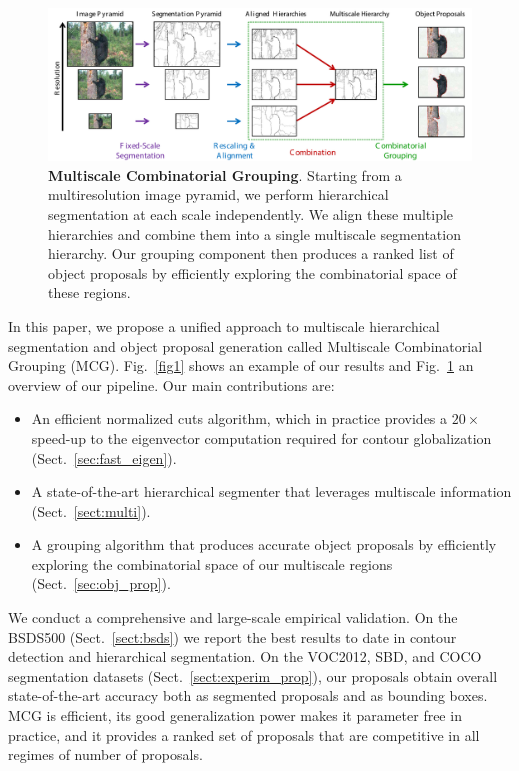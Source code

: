 \documentclass[10pt,journal,cspaper,compsoc]{IEEEtran}
\begin{document}
\begin{figure}[t]
\begin{center}
   \includegraphics[width=0.9\linewidth]{figures/overview/overview.pdf}
\end{center}
   \caption{\textbf{Multiscale Combinatorial Grouping}. Starting from a multiresolution image pyramid, we perform hierarchical segmentation at each scale independently. 
We align these multiple hierarchies and combine them into a single multiscale segmentation hierarchy. 
Our grouping component then produces a ranked list of object proposals by efficiently exploring the combinatorial space of these regions.}
\label{fig:overview}
\end{figure}


In this paper, we propose a unified approach to multiscale hierarchical segmentation and object proposal generation called Multiscale Combinatorial Grouping (MCG). 
Fig.~\ref{fig1} shows an example of our results and Fig.~\ref{fig:overview} an overview of our pipeline. Our main contributions are:
\begin{itemize}
\item An efficient normalized cuts algorithm, which in practice provides a $20\times$ speed-up to the eigenvector computation required for contour globalization \cite{Arbelaez2011,renNIPS12} (Sect.~\ref{sec:fast_eigen}).
\item A state-of-the-art hierarchical segmenter that leverages multiscale information (Sect.~\ref{sect:multi}).
\item A grouping algorithm that produces accurate object proposals by efficiently exploring the combinatorial space of our multiscale regions (Sect.~\ref{sec:obj_prop}).
\end{itemize}
We conduct a comprehensive and large-scale empirical validation.
On the BSDS500 (Sect.~\ref{sect:bsds}) we report the best results to date in contour detection and hierarchical segmentation. 
On the VOC2012, SBD, and COCO segmentation datasets (Sect.~\ref{sect:experim_prop}), our proposals obtain overall state-of-the-art accuracy
both as segmented proposals and as bounding boxes.
MCG is efficient, its good generalization power makes it parameter free in practice, and it provides a ranked set of proposals that are competitive in all regimes of number of proposals.
\end{document}
